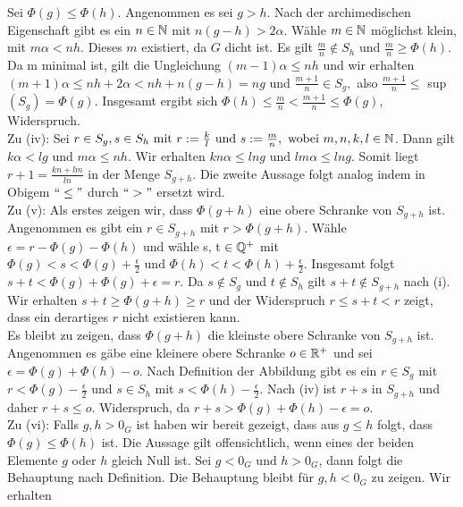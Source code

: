 {Sei $\Phi\left(g\right) \le \Phi\left(h\right)$. Angenommen es sei $g > h$. Nach der archimedischen Eigenschaft gibt es ein $ n \in \mathbb{N}$ mit $n\left(g-h\right) > 2\alpha$. Wähle $m \in \mathbb{N}$ möglichst klein, mit $m\alpha < nh$. Dieses $m$ existiert, da $G$ dicht ist. Es gilt $\frac{m}{n} \notin S_h$ und $\frac{m}{n} \geq \Phi\left(h\right).$
Da m minimal ist, gilt die Ungleichung $\left(m-1\right)\alpha \le nh$ und wir erhalten $ \left(m+1\right)\alpha \le nh + 2\alpha < nh + n(g-h) = ng$ und $\frac{m+1}{n} \in S_g,$ also $\frac{m+1}{n} \leq$ sup$\left(S_g\right) = \Phi\left(g\right)$. Insgesamt ergibt sich $\Phi\left(h\right) \le \frac{m}{n} < \frac{m + 1}{n} \le \Phi\left(g\right)$, Widerspruch.\\
%
%
%
%
%
%
Zu (iv): Sei $r \in S_g, s \in S_h \text{ mit } r := \frac{k}{l} \text{ und } s:= \frac{m}{n}, \text{ wobei } m, n ,k, l \in \mathbb{N}$. Dann gilt $k\alpha < lg $ und $ m\alpha \le nh$. Wir erhalten $kn\alpha \le lng \text{ und } lm\alpha \le lng.$ Somit liegt $r+1 = \frac{kn+lm}{ln}$ in der Menge $S_{g+h}.$ Die zweite Aussage folgt analog indem in Obigem $``\le "$ durch $``> "$ ersetzt wird.\\
%
%
%
%
%
%
Zu (v): Als erstes zeigen wir, dass $\Phi\left(g + h\right)$ eine obere Schranke von $S_{g+h}$ ist. Angenommen es gibt ein $r\in S_{g+h}$ mit $r > \Phi\left(g + h\right)$. Wähle $\epsilon = r - \Phi\left(g\right) - \Phi\left(h\right)$ und wähle s, t $\in \mathbb{Q}^{+}$ mit $\Phi(g) < s < \Phi(g) + \frac{\epsilon}{2} \text{ und } \Phi\left(h\right) < t < \Phi\left(h\right) +\frac{\epsilon}{2}$. Insgesamt folgt $s + t < \Phi\left(g\right) + \Phi\left(g\right) + \epsilon = r$. Da $s \notin S_g$ und $t \notin S_h$ gilt $s+t \notin S_{g+h}$ nach (i). Wir erhalten $s+ t \geq \Phi\left(g+h\right) \geq r$ und der Widerspruch $ r \le s+t < r$ zeigt, dass ein derartiges $r$ nicht existieren kann.\\
Es bleibt zu zeigen, dass $\Phi\left(g + h\right)$ die kleinste obere Schranke von $S_{g+h}$ ist. Angenommen es gäbe eine kleinere obere Schranke $ o \in \mathbb{R}^{+}$ und sei $\epsilon = \Phi(g) + \Phi(h) - o$. Nach Definition der Abbildung gibt es ein $r\in S_g$ mit $r < \Phi(g) - \frac{\epsilon}{2}$ und $ s \in S_h$ mit $s < \Phi(h) - \frac{\epsilon}{2}.$ Nach (iv) ist $r+s$ in $S_{g+h} $ und daher $ r +s \le o$. Widerspruch, da $r+s >\Phi(g) + \Phi(h) - \epsilon = o$.\\
%
%
%
%
%
Zu (vi): Falls $g, h > 0_{G}$ ist haben wir bereit gezeigt, dass aus $g\le h$ folgt, dass $\Phi(g) \leq \Phi(h)$ ist. Die Aussage gilt offensichtlich, wenn eines der beiden Elemente $g$ oder $h$ gleich Null ist. Sei $g < 0_G \text{ und } h > 0_G$, dann folgt die Behauptung nach Definition. Die Behauptung bleibt für $g, h < 0_G$ zu zeigen. Wir erhalten
}
